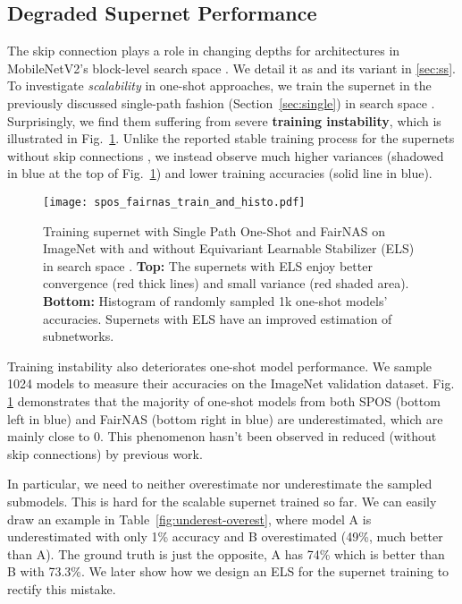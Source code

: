 \documentclass[10pt,twocolumn,letterpaper]{article}
\theoremstyle{definition}
\begin{document}
\subsection{Degraded Supernet Performance}


The skip connection plays a role in changing depths for architectures in MobileNetV2's block-level search space  \cite{cai2018proxylessnas,wu2018fbnet}. We detail it as  and its variant   in \ref{sec:ss}. To investigate \emph{scalability} in one-shot approaches, we train the supernet in the previously discussed single-path fashion (Section~\ref{sec:single}) in search space . Surprisingly, we find them suffering from severe \textbf{training instability}, which is illustrated in Fig.~\ref{fig:spos_fairnas_train_and_histo}. Unlike the reported stable training process for the supernets without skip connections \cite{guo2019single,chu2019fairnas}, we instead observe much higher variances (shadowed in blue at the top of Fig.~\ref{fig:spos_fairnas_train_and_histo}) and lower training accuracies (solid line in blue).  

\begin{figure}[ht]
	\centering
	\texttt{[image: spos\_fairnas\_train\_and\_histo.pdf]}
	\caption{Training supernet with Single Path One-Shot \protect\cite{guo2019single} and FairNAS \protect\cite{chu2019fairnas} on ImageNet with and without Equivariant Learnable Stabilizer (ELS) in search space . \textbf{Top:} The supernets with ELS enjoy better convergence (red thick lines) and small variance (red shaded area). \textbf{Bottom:} Histogram of randomly sampled 1k one-shot models'  accuracies. Supernets with ELS have an improved estimation of subnetworks.}
	\label{fig:spos_fairnas_train_and_histo}
\end{figure} 

Training instability also deteriorates one-shot model performance. We sample 1024 models to measure their accuracies on the ImageNet validation dataset. Fig. \ref{fig:spos_fairnas_train_and_histo} demonstrates that the majority of one-shot models from both SPOS (bottom left in blue)  and FairNAS (bottom right in blue) are underestimated, which are mainly close to 0. This phenomenon hasn't been observed in reduced  (without skip connections) by previous work.

In particular, we need to neither overestimate nor underestimate the sampled submodels. This is hard for the scalable supernet trained so far. We can easily draw an example in Table~\ref{fig:underest-overest}, where model A is underestimated with only 1\% accuracy and B overestimated (49\%, much better than A). The ground truth is just the opposite, A has 74\% which is better than B with 73.3\%. We later show how we design an ELS for the supernet training to rectify this mistake.
\end{document}
